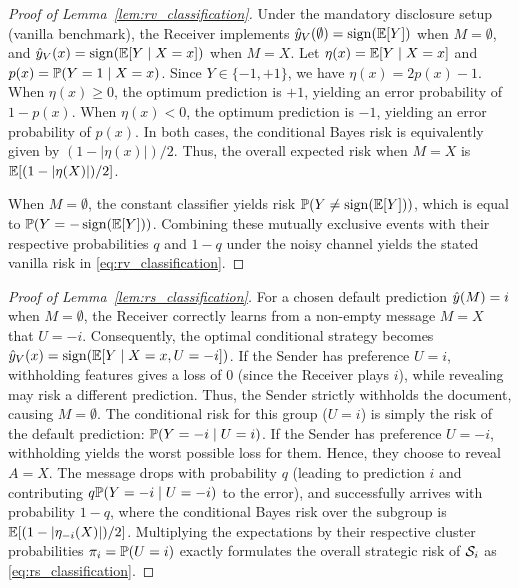 \begin{proof}[Proof of Lemma~\ref{lem:rv_classification}]
Under the mandatory disclosure setup (vanilla benchmark), the Receiver implements $\hat{y}_V(\emptyset) = \operatorname{sign}(\mathbb{E}[Y])$ when $M = \emptyset$, and $\hat{y}_V(x) = \operatorname{sign}(\mathbb{E}[Y \mid X=x])$ when $M = X$.
Let $\eta(x) = \mathbb{E}[Y \mid X=x]$ and $p(x) = \mathbb{P}(Y=1 \mid X=x)$. Since $Y \in \{-1, +1\}$, we have $\eta(x) = 2p(x) - 1$.
When $\eta(x) \ge 0$, the optimum prediction is $+1$, yielding an error probability of $1 - p(x)$. When $\eta(x) < 0$, the optimum prediction is $-1$, yielding an error probability of $p(x)$. In both cases, the conditional Bayes risk is equivalently given by $(1 - |\eta(x)|)/2$. Thus, the overall expected risk when $M=X$ is $\mathbb{E}[(1 - |\eta(X)|)/2]$.

When $M = \emptyset$, the constant classifier yields risk $\mathbb{P}(Y \neq \operatorname{sign}(\mathbb{E}[Y]))$, which is equal to $\mathbb{P}(Y = -\operatorname{sign}(\mathbb{E}[Y]))$. 
Combining these mutually exclusive events with their respective probabilities $q$ and $1-q$ under the noisy channel yields the stated vanilla risk in \eqref{eq:rv_classification}.
\end{proof}

\begin{proof}[Proof of Lemma~\ref{lem:rs_classification}]
For a chosen default prediction $\hat{y}(M) = i$ when $M = \emptyset$, the Receiver correctly learns from a non-empty message $M = X$ that $U = -i$. Consequently, the optimal conditional strategy becomes $\hat{y}_V(x) = \operatorname{sign}(\mathbb{E}[Y \mid X=x, U=-i])$. 
If the Sender has preference $U = i$, withholding features gives a loss of $0$ (since the Receiver plays $i$), while revealing may risk a different prediction. Thus, the Sender strictly withholds the document, causing $M = \emptyset$. The conditional risk for this group ($U = i$) is simply the risk of the default prediction: $\mathbb{P}(Y = -i \mid U=i)$.
If the Sender has preference $U = -i$, withholding yields the worst possible loss for them. Hence, they choose to reveal $A = X$. The message drops with probability $q$ (leading to prediction $i$ and contributing $q\mathbb{P}(Y = -i \mid U=-i)$ to the error), and successfully arrives with probability $1-q$, where the conditional Bayes risk over the subgroup is $\mathbb{E}[(1-|\eta_{-i}(X)|)/2]$.
Multiplying the expectations by their respective cluster probabilities $\pi_i = \mathbb{P}(U=i)$ exactly formulates the overall strategic risk of $\mathcal{S}_i$ as \eqref{eq:rs_classification}.
\end{proof}

